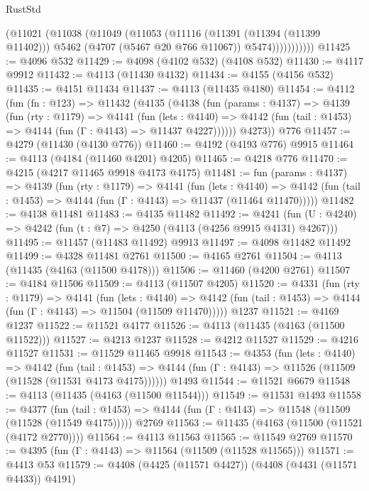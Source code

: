 \begin{lexlean}{RustStd}
\begin{coremodule}
                (@11021
                  (@11038
                    (@11049
                      (@11053
                        (@11116
                          (@11391 (@11394 (@11399 @11402)))
                          @5462
                          (@4707 (@5467 @20 @766 @11067))
                          @5474)))))))))))
@11425 := @4096 @532
@11429 := @4098 (@4102 @532) (@4108 @532)
@11430 := @4117 @9912
@11432 := @4113 (@11430 @4132)
@11434 := @4155 (@4156 @532)
@11435 := @4151 @11434
@11437 := @4113 (@11435 @4180)
@11454 := @4112
    (fun (fn : @123) =>
    @11432
      (@4135
        (@4138
          (fun (params : @4137) =>
          @4139
            (fun (rty : @1179) =>
            @4141
              (fun (lets : @4140) =>
              @4142 (fun (tail : @1453) => @4144 (fun (Γ : @4143) => @11437 @4227))))))
        @4273))
    @776
@11457 := @4279 (@11430 (@4130 @776))
@11460 := @4192 (@4193 @776) @9915
@11464 := @4113 (@4184 (@11460 @4201) @4205)
@11465 := @4218 @776
@11470 := @4215 (@4217 @11465 @9918 @4173 @4175)
@11481 := fun (params : @4137) =>
  @4139
    (fun (rty : @1179) =>
    @4141
      (fun (lets : @4140) =>
      @4142 (fun (tail : @1453) => @4144 (fun (Γ : @4143) => @11437 (@11464 @11470)))))
@11482 := @4138 @11481
@11483 := @4135 @11482
@11492 := @4241 (fun (U : @4240) => @4242 (fun (t : @7) => @4250 (@4113 (@4256 @9915 @4131) @4267)))
@11495 := @11457 (@11483 @11492) @9913
@11497 := @4098 @11482 @11492
@11499 := @4328 @11481 @2761
@11500 := @4165 @2761
@11504 := @4113 (@11435 (@4163 (@11500 @4178)))
@11506 := @11460 (@4200 @2761)
@11507 := @4184 @11506
@11509 := @4113 (@11507 @4205)
@11520 := @4331
    (fun (rty : @1179) =>
    @4141
      (fun (lets : @4140) =>
      @4142 (fun (tail : @1453) => @4144 (fun (Γ : @4143) => @11504 (@11509 @11470)))))
    @1237
@11521 := @4169 @1237
@11522 := @11521 @4177
@11526 := @4113 (@11435 (@4163 (@11500 @11522)))
@11527 := @4213 @1237
@11528 := @4212 @11527
@11529 := @4216 @11527
@11531 := @11529 @11465 @9918
@11543 := @4353
    (fun (lets : @4140) =>
    @4142
      (fun (tail : @1453) =>
      @4144 (fun (Γ : @4143) => @11526 (@11509 (@11528 (@11531 @4173 @4175))))))
    @1493
@11544 := @11521 @6679
@11548 := @4113 (@11435 (@4163 (@11500 @11544)))
@11549 := @11531 @1493
@11558 := @4377
    (fun (tail : @1453) => @4144 (fun (Γ : @4143) => @11548 (@11509 (@11528 (@11549 @4175)))))
    @2769
@11563 := @11435 (@4163 (@11500 (@11521 (@4172 @2770))))
@11564 := @4113 @11563
@11565 := @11549 @2769
@11570 := @4395 (fun (Γ : @4143) => @11564 (@11509 (@11528 @11565)))
@11571 := @4413 @53
@11579 := @4408 (@4425 (@11571 @4427)) (@4408 (@4431 (@11571 @4433)) @4191)

\end{coremodule}
\end{lexlean}
